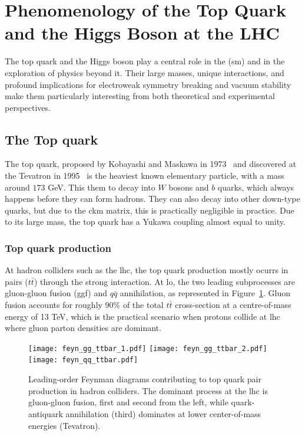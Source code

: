 \section{Phenomenology of the Top Quark and the Higgs Boson at the LHC}
\label{sec:top_higgs_lhc}
The top quark and the Higgs boson play a central role in the (\acrshort{sm}) and in the exploration of physics beyond it. Their large masses, unique interactions, and profound implications for electroweak symmetry breaking and vacuum stability make them particularly interesting from both theoretical and experimental perspectives. 

\subsection{The Top quark}
\label{sec:top_quark}

The top quark, proposed by Kobayashi and Maskawa in 1973~\cite{10.1143/PTP.49.652} and discovered at the Tevatron in 1995~\cite{PhysRevLett.74.2626,PhysRevLett.74.2632} is the heaviest known elementary particle, with a mass around $173$ GeV. This them to decay into $W$ bosons and $b$ quarks, which always happens before they can form hadrons. They can also decay into other down-type quarks, but due to the \acrshort{ckm} matrix, this is practically negligible in practice. Due to its large mass, the top quark has a Yukawa coupling almost equal to unity.

\subsubsection*{Top quark production}
\label{subsec:top_quark_prod}
At hadron colliders such as the \acrshort{lhc}, the top quark production mostly ocurrs in pairs ($t\bar{t}$) through the strong interaction. At \acrshort{lo}, the two leading subprocesses are gluon-gluon fusion (\acrshort{ggf}) and $q\bar{q}$ annihilation, as represented in Figure~\ref{fig:tt-production}. Gluon fusion accounts for roughly $90\%$ of the total $t\bar{t}$ cross-section at a centre-of-mass energy of 13 TeV, which is the practical scenario when protons collide at \acrshort{lhc} where gluon parton densities are dominant. 
\begin{figure}[htbp]
    \centering


        \centering
        \texttt{[image: feyn\_gg\_ttbar\_1.pdf]}
        \texttt{[image: feyn\_gg\_ttbar\_2.pdf]}
        \texttt{[image: feyn\_qq\_ttbar.pdf]}
    

    \caption{Leading-order Feynman diagrams contributing to top quark pair production in hadron colliders. The dominant process at the \acrshort{lhc} is gluon-gluon fusion, first and second from the left, while quark-antiquark annihilation (third) dominates at lower center-of-mass energies (Tevatron).}
    \label{fig:tt-production}
\end{figure}

